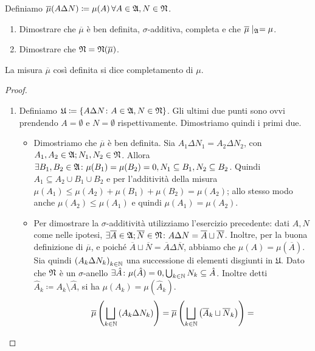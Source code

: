 \documentclass[../EserciziIstituzioniAnalisi.tex]{subfiles}
\begin{document}
\begin{exercise}[2016-10-27]
  Definiamo $\overline \mu(A \Delta N) \coloneqq \mu (A) \,\forall A \in \mathfrak A,N\in\mathfrak N$.
  \begin{enumerate}
    \item Dimostrare che $\overline \mu$ è ben definita, $\sigma$-additiva, completa e che $\overline \mu\mid_{\mathfrak A}=\mu$.
    \item Dimostrare che $\mathfrak N=\mathfrak N(\overline{\mu})$.
  \end{enumerate}
\end{exercise}
\begin{remark}
  La misura $\overline\mu$ così definita si dice completamento di $\mu$.
\end{remark}
\begin{proof}
  \begin{enumerate}
    \item Definiamo $\mathfrak{U}\coloneqq \left\{A\Delta N\colon A\in\mathfrak A,N\in\mathfrak N\right\}$. Gli ultimi due punti sono ovvi prendendo $A=\emptyset$ e $N=\emptyset$ rispettivamente. Dimostriamo quindi i primi due.
    \begin{itemize}
      \item Dimostriamo che $\overline\mu$ è ben definita. Sia $A_1 \Delta N_1=A_2\Delta N_2$, con $A_1,A_2\in \mathfrak A; N_1,N_2\in\mathfrak N$. Allora $\exists B_1, B_2\in \mathfrak A\colon \mu(B_1)=\mu(B_2)=0, N_1\subseteq B_1, N_2\subseteq B_2$. Quindi $A_1\subseteq A_2\cup B_1 \cup B_2$ e per l'additività della misura $\mu(A_1)\leq \mu(A_2)+\mu(B_1)+\mu(B_2)=\mu(A_2)$; allo stesso modo anche $\mu(A_2)\leq \mu(A_1)$ e quindi $\mu(A_1)=\mu(A_2)$.
      \item Per dimostrare la $\sigma$-additività utilizziamo l'esercizio precedente: dati $A,N$ come nelle ipotesi, $\exists \overline A\in \mathfrak A; \overline N\in\mathfrak N \colon A \Delta N= \overline A \sqcup \overline N$. Inoltre, per la buona definizione di $\overline \mu$, e poiché $\overline A \sqcup \overline N=\overline A \Delta \overline N$, abbiamo che $\mu(A)=\mu(\overline A)$. Sia quindi $\left(A_k \Delta N_k \right)_{k\in \mathbb N}$ una successione di elementi disgiunti in $\mathfrak{U}$. Dato che $\mathfrak N$ è un $\sigma$-anello $\exists \hat A\colon \mu(\hat A)=0, \bigcup_{k \in \mathbb N} N_k\subseteq \hat A$. Inoltre detti $\hat A_k\coloneqq A_k \setminus \hat A$, si ha $\mu(A_k)=\mu(\hat A_k)$.
      \begin{equation*}
        \begin{aligned}
          \overline \mu\left(\bigsqcup_{k\in \N} \left( A_k \Delta N_k\right)\right)&=\overline \mu\left(\bigsqcup_{k\in \N} \left(\overline A_k \sqcup \overline N_k\right)\right)=\\

\end{aligned}
\end{equation*}
\end{itemize}
\end{enumerate}
\end{proof}
\end{document}
